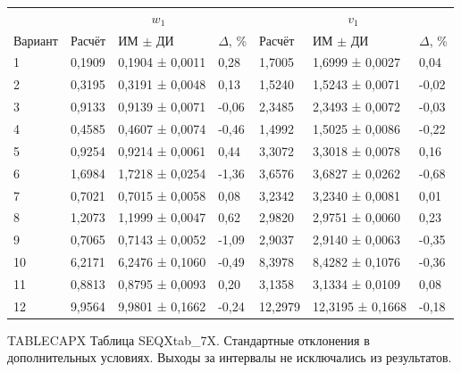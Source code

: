 \setlength{\tabcolsep}{2pt}
\begin{tabular}{p{4.16cm}p{1.61cm}p{2.83cm}p{1.28cm}p{1.61cm}p{2.83cm}p{1.28cm}}
\toprule
 & \multicolumn{3}{c}{$w_1$} & \multicolumn{3}{c}{$v_1$} \\
Вариант & Расчёт & ИМ $\pm$ ДИ & $\Delta$, \% & Расчёт & ИМ $\pm$ ДИ & $\Delta$, \% \\
\midrule
1 & 0,1909 & 0,1904 ± 0,0011 & 0,28 & 1,7005 & 1,6999 ± 0,0027 & 0,04 \\
2 & 0,3195 & 0,3191 ± 0,0048 & 0,13 & 1,5240 & 1,5243 ± 0,0071 & -0,02 \\
3 & 0,9133 & 0,9139 ± 0,0071 & -0,06 & 2,3485 & 2,3493 ± 0,0072 & -0,03 \\
4 & 0,4585 & 0,4607 ± 0,0074 & -0,46 & 1,4992 & 1,5025 ± 0,0086 & -0,22 \\
5 & 0,9254 & 0,9214 ± 0,0061 & 0,44 & 3,3072 & 3,3018 ± 0,0078 & 0,16 \\
6 & 1,6984 & 1,7218 ± 0,0254 & -1,36 & 3,6576 & 3,6827 ± 0,0262 & -0,68 \\
7 & 0,7021 & 0,7015 ± 0,0058 & 0,08 & 3,2342 & 3,2340 ± 0,0081 & 0,01 \\
8 & 1,2073 & 1,1999 ± 0,0047 & 0,62 & 2,9820 & 2,9751 ± 0,0060 & 0,23 \\
9 & 0,7065 & 0,7143 ± 0,0052 & -1,09 & 2,9037 & 2,9140 ± 0,0063 & -0,35 \\
10 & 6,2171 & 6,2476 ± 0,1060 & -0,49 & 8,3978 & 8,4282 ± 0,1076 & -0,36 \\
11 & 0,8813 & 0,8795 ± 0,0093 & 0,20 & 3,1358 & 3,1334 ± 0,0109 & 0,08 \\
12 & 9,9564 & 9,9801 ± 0,1662 & -0,24 & 12,2979 & 12,3195 ± 0,1668 & -0,18 \\
\bottomrule
\end{tabular}




\noindent TABLECAPX Таблица SEQXtab_7X. Стандартные отклонения в дополнительных условиях. Выходы за интервалы не исключались из результатов.\par

